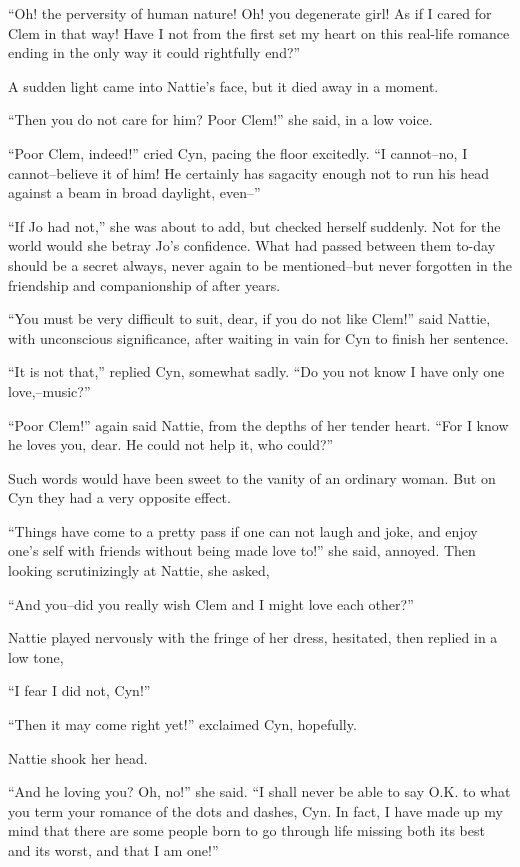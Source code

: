 ``Oh! the perversity of human nature! Oh! you degenerate girl! As if I
cared for Clem in that way! Have I not from the first set my heart on
this real-life romance ending in the only way it could rightfully end?''

A sudden light came into Nattie's face, but it died away in a moment.

``Then you do not care for him? Poor Clem!'' she said, in a low voice.

``Poor Clem, indeed!'' cried Cyn, pacing the floor excitedly. ``I
cannot--no, I cannot--believe it of him! He certainly has sagacity
enough not to run his head against a beam in broad daylight, even--''

``If Jo had not,'' she was about to add, but checked herself suddenly. Not
for the world would she betray Jo's confidence. What had passed between
them to-day should be a secret always, never again to be mentioned--but
never forgotten in the friendship and companionship of after years.

``You must be very difficult to suit, dear, if you do not like Clem!''
said Nattie, with unconscious significance, after waiting in vain for
Cyn to finish her sentence.

``It is not that,'' replied Cyn, somewhat sadly. ``Do you not know I have
only one love,--music?''

``Poor Clem!'' again said Nattie, from the depths of her tender heart.
``For I know he loves you, dear. He could not help it, who could?''

Such words would have been sweet to the vanity of an ordinary woman. But
on Cyn they had a very opposite effect.

``Things have come to a pretty pass if one can not laugh and joke, and
enjoy one's self with friends without being made love to!'' she said,
annoyed. Then looking scrutinizingly at Nattie, she asked,

``And you--did you really wish Clem and I might love each other?''

Nattie played nervously with the fringe of her dress, hesitated, then
replied in a low tone,

``I fear I did not, Cyn!''

``Then it may come right yet!'' exclaimed Cyn, hopefully.

Nattie shook her head.

``And he loving you? Oh, no!'' she said. ``I shall never be able to say
O.K. to what you term your romance of the dots and dashes, Cyn. In fact,
I have made up my mind that there are some people born to go through
life missing both its best and its worst, and that I am one!''

